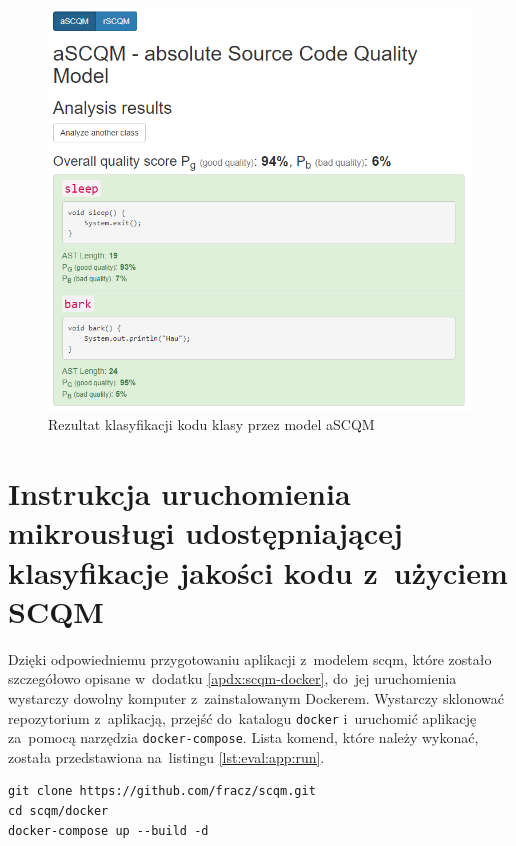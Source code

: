 \documentclass[twoside]{praca}
\begin{document}
\begin{figure}[h!]
\centering
\includegraphics[width=\textwidth]{eval/ascqm-result.png}
\caption{Rezultat klasyfikacji kodu klasy przez model aSCQM}
\label{fig:eval:ascqm-result}
\end{figure}

\clearpage
\section{Instrukcja uruchomienia mikrousługi udostępniającej klasyfikacje jakości kodu z~użyciem SCQM}
\label{apdx:scqm-usage}
\label{sec:eval:scqm-usage}
\setcounter{table}{0}
\renewcommand{\thetable}{F.\arabic{table}}
\setcounter{figure}{0}
\renewcommand{\thefigure}{F.\arabic{figure}}
\setcounter{lstlisting}{0}
\renewcommand{\thelstlisting}{F.\arabic{lstlisting}}

Dzięki odpowiedniemu przygotowaniu aplikacji z~modelem \gls{scqm}, które zostało szczegółowo opisane w~dodatku \ref{apdx:scqm-docker}, do~jej uruchomienia wystarczy dowolny komputer z~zainstalowanym Dockerem. Wystarczy sklonować repozytorium z~aplikacją, przejść do~katalogu \texttt{docker} i~uruchomić aplikację za~pomocą narzędzia \texttt{docker-compose}. Lista komend, które należy wykonać, została przedstawiona na~listingu \ref{lst:eval:app:run}.

\begin{lstlisting}[frame=single,caption={Komendy uruchamiające aplikację z~modelem SCQM},captionpos=b,label={lst:eval:app:run}]
git clone https://github.com/fracz/scqm.git
cd scqm/docker
docker-compose up --build -d
\end{lstlisting}
\end{document}
